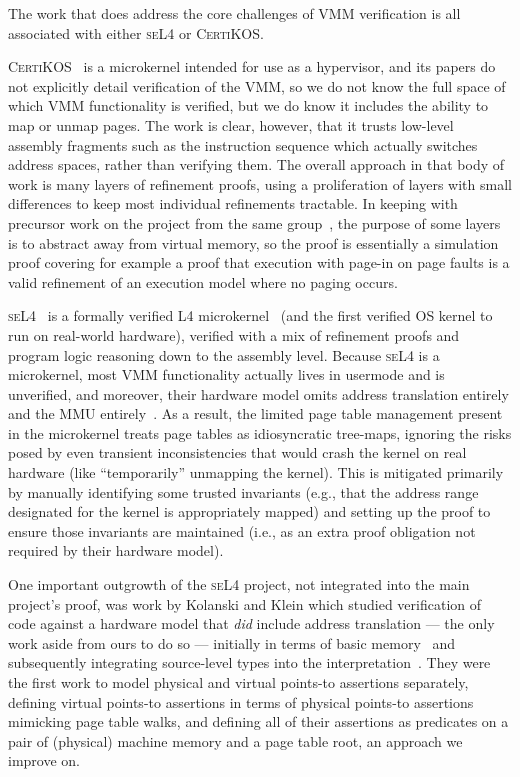 \documentclass[acmsmall,screen,nonacm]{acmart}
\begin{document}
The work that does address the core challenges of VMM verification is all associated with either \textsc{seL4} or \textsc{CertiKOS}.

\textsc{CertiKOS}~\cite{gu15,gu2016certikos,gu2018certikos,chen2016interrupts} is a microkernel intended for use as a hypervisor,
and its papers do not explicitly detail verification of the VMM, so we do not know the full space of which VMM functionality 
is verified, but we do know it includes the ability to map or unmap pages.
The work is clear, however, that it trusts low-level assembly fragments such as the instruction sequence which actually
switches address spaces, rather than verifying them.
The overall approach in that body of work is many layers of refinement proofs, using a
 proliferation of layers with small differences to keep most individual refinements tractable. In keeping with precursor work 
on the project from the same group~\cite{vaynberg2012compositional}, the purpose of some layers is to abstract away from 
virtual memory, so the proof is essentially a simulation proof covering for example a proof that execution with page-in on 
page faults is a valid refinement of an execution model where no paging occurs.
%
%
%
%
%
%
%
%
%
%

\textsc{seL4}~\cite{Klein2009seL4,seL4TOCS,Sewell2013translation} is a formally verified L4 microkernel~\cite{Liedtke1995,Liedtke1996} (and the first verified OS kernel to run on real-world hardware), verified with a mix of refinement proofs and program logic reasoning down to the assembly level.
Because \textsc{seL4} is a microkernel, most VMM functionality actually lives in usermode and is unverified, and moreover, their hardware model omits address translation entirely and the MMU entirely~\cite{Klein2009seL4,seL4TOCS}. As a result, the limited page table management present in the microkernel treats page tables as idiosyncratic tree-maps, ignoring the risks posed by even transient inconsistencies that would crash the kernel on real hardware (like ``temporarily'' unmapping the kernel). This is mitigated primarily by manually identifying some trusted invariants (e.g., that the address range designated for the kernel is appropriately mapped) and setting up the proof to ensure those invariants are maintained (i.e., as an extra proof obligation not required by their hardware model).


One important outgrowth of the \textsc{seL4} project, not integrated into the main project's proof, was work by 
Kolanski and Klein which studied verification of code against a hardware model that \emph{did} include address translation
 --- the only work aside from ours to do so --- initially in terms of basic memory~\cite{kolanski08vstte} and subsequently 
integrating source-level types into the interpretation~\cite{kolanski09tphols}. 
They were the first work to model physical and virtual points-to assertions separately, defining virtual points-to assertions
in terms of physical points-to assertions mimicking page table walks, and defining all of their assertions as predicates on a
pair of (physical) machine memory and a page table root, an approach we improve on.
\end{document}
